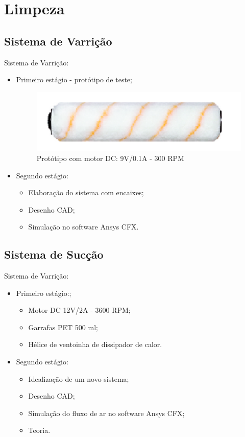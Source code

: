 \documentclass{beamer}
\begin{document}
\section{Limpeza}
\subsection{Sistema de Varrição}
\begin{frame}
  Sistema de Varrição:
    \begin{itemize}
        \item Primeiro estágio - protótipo de teste;
        \begin{figure}
          \centering
          \includegraphics[width=0.8\linewidth]{limpeza_1}
          \caption{Protótipo com motor DC: 9V/0.1A - 300 RPM}
        \end{figure}
        \item Segundo estágio:
        \begin{itemize}
          \item Elaboração do sistema com encaixes;
          \item Desenho CAD;
          \item Simulação no software Ansys CFX.
        \end{itemize}
    \end{itemize}
\end{frame}

\subsection{Sistema de Sucção}
\begin{frame}
  Sistema de Varrição:
    \begin{itemize}
        \item Primeiro estágio:;
        \begin{itemize}
          \item Motor DC 12V/2A - 3600 RPM;
          \item Garrafas PET 500 ml;
          \item Hélice de ventoinha de dissipador de calor.
        \end{itemize}
        \item Segundo estágio:
        \begin{itemize}
          \item Idealização de um novo sistema;
          \item Desenho CAD;
          \item Simulação do fluxo de ar no software Ansys CFX;
          \item Teoria.
        \end{itemize}
    \end{itemize}
\end{frame}
\end{document}
